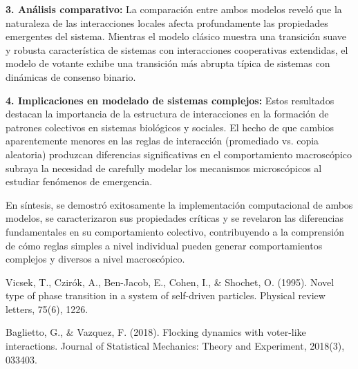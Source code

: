 \documentclass{article}
\begin{document}
\medskip

\textbf{3. Análisis comparativo:} La comparación entre ambos modelos reveló que la naturaleza de las interacciones locales afecta profundamente las propiedades emergentes del sistema. Mientras el modelo clásico muestra una transición suave y robusta característica de sistemas con interacciones cooperativas extendidas, el modelo de votante exhibe una transición más abrupta típica de sistemas con dinámicas de consenso binario.

\medskip

\textbf{4. Implicaciones en modelado de sistemas complejos:} Estos resultados destacan la importancia de la estructura de interacciones en la formación de patrones colectivos en sistemas biológicos y sociales. El hecho de que cambios aparentemente menores en las reglas de interacción (promediado vs. copia aleatoria) produzcan diferencias significativas en el comportamiento macroscópico subraya la necesidad de carefully modelar los mecanismos microscópicos al estudiar fenómenos de emergencia.

\medskip



En síntesis, se demostró exitosamente la implementación computacional de ambos modelos, se caracterizaron sus propiedades críticas y se revelaron las diferencias fundamentales en su comportamiento colectivo, contribuyendo a la comprensión de cómo reglas simples a nivel individual pueden generar comportamientos complejos y diversos a nivel macroscópico.

\begin{thebibliography}{9}
Vicsek, T., Czirók, A., Ben-Jacob, E., Cohen, I., \& Shochet, O. (1995). Novel type of phase transition in a system of self-driven particles. Physical review letters, 75(6), 1226.

Baglietto, G., \& Vazquez, F. (2018). Flocking dynamics with voter-like interactions. Journal of Statistical Mechanics: Theory and Experiment, 2018(3), 033403.
\end{thebibliography}
\end{document}
